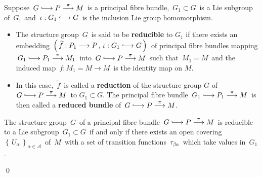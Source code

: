 
\vskip 0.5cm
\begin{definition}
\mbox{}
\vskip 0.2cm
\noindent
Suppose
\,$G \longhookrightarrow P \overset{\pi}{\longrightarrow} M$\,
is a principal fibre bundle,
\,$G_{1} \subset G$\, is a Lie subgroup of \,$G$,\, and
\,$\iota:G_{1}\longhookrightarrow G$\,
is the inclusion Lie group homomorphism.
\begin{itemize}
\item
	\vskip -0.2cm
	The structure group \,$G$\, is said to be \textbf{reducible} to $G_{1}$
	if there exists an embedding
	\,$\left(\,\widetilde{f}:P_{1}\longrightarrow P\,,\,\iota:G_{1}\longhookrightarrow G\,\right)$\,
	of principal fibre bundles mapping
	\,$G_{1} \longhookrightarrow P_{1} \overset{\pi}{\longrightarrow} M_{1}$\,
	into
	\,$G \longhookrightarrow P \overset{\pi}{\longrightarrow} M$\,
	such that
	\,$M_{1} = M$\,
	and the induced map
	\,$f : M_{1} = M \longrightarrow M$\,
	is the identity map on $M$.
\item
	In this case,
	\,$\widetilde{f}$\, is called a \textbf{reduction} of the structure group $G$ of
	\,$G \longhookrightarrow P \overset{\pi}{\longrightarrow} M$\,
	to $G_{1} \subset G$.
	The principal fibre bundle
	\,$G_{1} \longhookrightarrow P_{1} \overset{\pi}{\longrightarrow} M$\,
	is then called a \textbf{reduced bundle} of
	\,$G \longhookrightarrow P \overset{\pi}{\longrightarrow} M$.\,
	
\end{itemize}
\end{definition}


\vskip 0.5cm
\begin{proposition}
\mbox{}
\vskip 0.2cm
\noindent
The structure group \,$G$\, of a principal fibre bundle
\,$G \longhookrightarrow P \overset{\pi}{\longrightarrow} M$\,
is reducible to a Lie subgroup 
\,$G_{1} \subset G$\, if and only if
there exists an open covering
\,$\left\{\,U_{\alpha}\,\right\}_{\alpha\in\mathcal{A}}$\,
of \,$M$\, with a set of transition functions
\,$\tau_{\beta\alpha}$\,
which take values in \,$G_{1}$.
\end{proposition}
\proof
\qed


